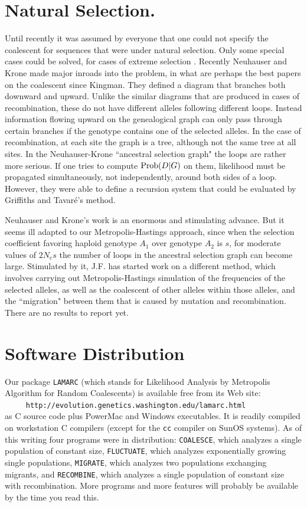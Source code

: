 \section{Natural Selection.}

Until recently it was assumed by everyone that one could not specify
the coalescent for sequences that were under natural selection.  Only
some special cases could be solved, for cases of extreme selection
\cite{Kaplan88, Hudson88, Takahata90}. Recently Neuhauser and Krone \cite{Neuhauser97, Krone97} made major inroads into the
problem, in what are perhaps the best papers on the coalescent since
Kingman.  They defined a diagram that branches both downward and upward.
Unlike the similar diagrams that are produced in cases of recombination,
these do not have different alleles following different loops.  Instead
information flowing upward on the genealogical graph can only pass through
certain branches if the genotype contains one of the selected alleles.
In the case of recombination, at each site the graph is a tree, although not
the same tree at all sites.  In the Neuhauser-Krone ``ancestral selection
graph" the loops are rather more serious.  If one tries to compute
$\mathop{\rm Prob}\nolimits(D|G)$ on them, likelihood must be propagated simultaneously, not
independently, around both sides of a loop.  However, they were able to
define a recursion system that could be evaluated by Griffiths and Tavar\'e's
method.

Neuhauser and Krone's work is an enormous and stimulating advance.  But it
seems ill adapted to our Metropolis-Hastings approach, since 
when the selection coefficient favoring haploid genotype $A_1$ over
genotype $A_2$ is $s$, for moderate
values of $2N_es$ the number of loops in the ancestral selection graph can
become large.  Stimulated by it, J.F. has started work on a different method,
which involves carrying out Metropolis-Hastings simulation of the
frequencies of the selected alleles, as well as the coalescent of other
alleles within those alleles, and the ``migration" between them that is caused
by mutation and recombination.  There are no results to report yet.

\section{Software Distribution}

Our package {\tt LAMARC} (which stands for Likelihood Analysis by
Metropolis Algorithm for Random Coalescents) is available free from its
Web site:\\
{\tt \ \ \ \ \ http://evolution.genetics.washington.edu/lamarc.html}\\
as C source code plus PowerMac and Windows executables.  It is readily
compiled on workstation C compilers (except for the {\tt cc}
compiler on SunOS systems).  As of this writing four programs were
in distribution: {\tt COALESCE}, which analyzes a single population of
constant size, {\tt FLUCTUATE}, which analyzes exponentially growing
single populations, {\tt MIGRATE}, which analyzes two populations
exchanging migrants, and {\tt RECOMBINE}, which analyzes a single
population of constant size with recombination.  More programs and more features will probably
be available by the time you read this.

